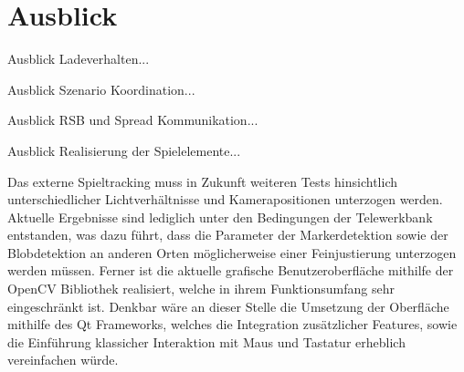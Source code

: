 \chapter{Ausblick} \label{kap:ausblick}

Ausblick Ladeverhalten...

Ausblick Szenario Koordination...

Ausblick RSB und Spread Kommunikation...

Ausblick Realisierung der Spielelemente...

Das externe Spieltracking muss in Zukunft weiteren Tests hinsichtlich unterschiedlicher Lichtverhältnisse und Kamerapositionen unterzogen werden. Aktuelle Ergebnisse sind lediglich unter den Bedingungen der Telewerkbank entstanden, was dazu führt, dass die Parameter der Markerdetektion sowie der Blobdetektion an anderen Orten möglicherweise einer Feinjustierung unterzogen werden müssen.
Ferner ist die aktuelle grafische Benutzeroberfläche mithilfe der OpenCV Bibliothek realisiert, welche in ihrem Funktionsumfang sehr eingeschränkt ist. Denkbar wäre an dieser Stelle die Umsetzung der Oberfläche mithilfe des Qt Frameworks, welches die Integration zusätzlicher Features, sowie die Einführung klassicher Interaktion mit Maus und Tastatur erheblich vereinfachen würde.
